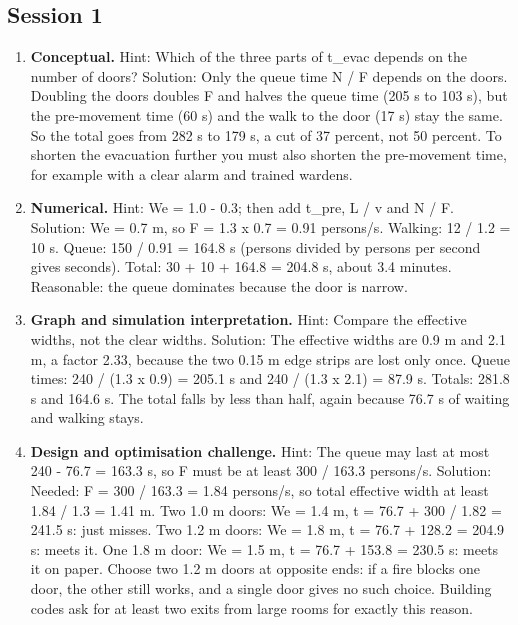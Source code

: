 \documentclass[11pt,a4paper]{article}
\begin{document}
\subsection*{Session 1}
\begin{enumerate}[nosep]
\item \textbf{Conceptual.} Hint: Which of the three parts of t\_evac depends on the number of doors? Solution: Only the queue time N / F depends on the doors. Doubling the doors doubles F and halves the queue time (205 s to 103 s), but the pre-movement time (60 s) and the walk to the door (17 s) stay the same. So the total goes from 282 s to 179 s, a cut of 37 percent, not 50 percent. To shorten the evacuation further you must also shorten the pre-movement time, for example with a clear alarm and trained wardens.
\item \textbf{Numerical.} Hint: We = 1.0 - 0.3; then add t\_pre, L / v and N / F. Solution: We = 0.7 m, so F = 1.3 x 0.7 = 0.91 persons/s. Walking: 12 / 1.2 = 10 s. Queue: 150 / 0.91 = 164.8 s (persons divided by persons per second gives seconds). Total: 30 + 10 + 164.8 = 204.8 s, about 3.4 minutes. Reasonable: the queue dominates because the door is narrow.
\item \textbf{Graph and simulation interpretation.} Hint: Compare the effective widths, not the clear widths. Solution: The effective widths are 0.9 m and 2.1 m, a factor 2.33, because the two 0.15 m edge strips are lost only once. Queue times: 240 / (1.3 x 0.9) = 205.1 s and 240 / (1.3 x 2.1) = 87.9 s. Totals: 281.8 s and 164.6 s. The total falls by less than half, again because 76.7 s of waiting and walking stays.
\item \textbf{Design and optimisation challenge.} Hint: The queue may last at most 240 - 76.7 = 163.3 s, so F must be at least 300 / 163.3 persons/s. Solution: Needed: F = 300 / 163.3 = 1.84 persons/s, so total effective width at least 1.84 / 1.3 = 1.41 m. Two 1.0 m doors: We = 1.4 m, t = 76.7 + 300 / 1.82 = 241.5 s: just misses. Two 1.2 m doors: We = 1.8 m, t = 76.7 + 128.2 = 204.9 s: meets it. One 1.8 m door: We = 1.5 m, t = 76.7 + 153.8 = 230.5 s: meets it on paper. Choose two 1.2 m doors at opposite ends: if a fire blocks one door, the other still works, and a single door gives no such choice. Building codes ask for at least two exits from large rooms for exactly this reason.
\end{enumerate}
\end{document}
